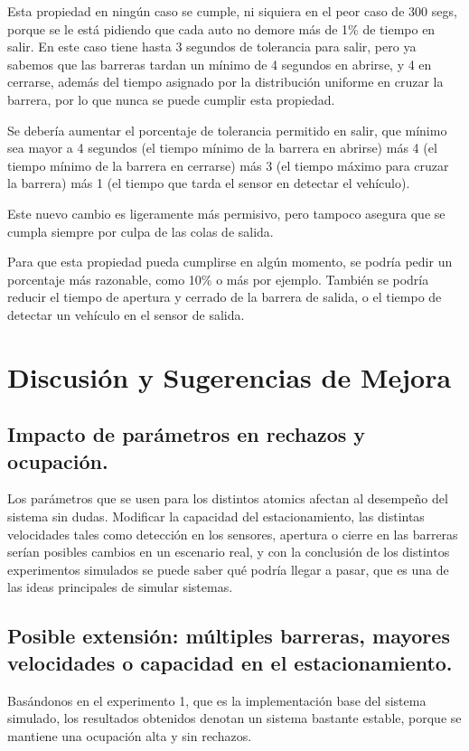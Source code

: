 \documentclass[12pt]{article}
\begin{document}
Esta propiedad en ningún caso se cumple, ni siquiera en el peor caso de 300 segs, porque se le está pidiendo que cada auto no demore más de 1\% de tiempo en salir. En este caso tiene hasta 3 segundos de tolerancia para salir, pero ya sabemos que las barreras tardan un mínimo de 4 segundos en abrirse, y 4 en cerrarse, además del tiempo asignado por la distribución uniforme en cruzar la barrera, por lo que nunca se puede cumplir esta propiedad.

Se debería aumentar el porcentaje de tolerancia permitido en salir, que mínimo sea mayor a 4 segundos (el tiempo mínimo de la barrera en abrirse) más 4 (el tiempo mínimo de la barrera en cerrarse) más 3 (el tiempo máximo para cruzar la barrera) más 1 (el tiempo que tarda el sensor en detectar el vehículo).

Este nuevo cambio es ligeramente más permisivo, pero tampoco asegura que se cumpla siempre por culpa de las colas de salida. 

Para que esta propiedad pueda cumplirse en algún momento, se podría pedir un porcentaje más razonable, como 10\% o más por ejemplo. También se podría reducir el tiempo de apertura y cerrado de la barrera de salida, o el tiempo de detectar un vehículo en el sensor de salida.

\section{Discusión y Sugerencias de Mejora}

\subsection{Impacto de parámetros en rechazos y ocupación.}
Los parámetros que se usen para los distintos atomics afectan al desempeño del sistema sin dudas. Modificar la capacidad del estacionamiento, las distintas velocidades tales como detección en los sensores, apertura o cierre en las barreras serían posibles cambios en un escenario real, y con la conclusión de los distintos experimentos simulados se puede saber qué podría llegar a pasar, que es una de las ideas principales de simular sistemas.

\subsection{Posible extensión: múltiples barreras, mayores velocidades o capacidad en el estacionamiento.}
Basándonos en el experimento 1, que es la implementación base del sistema simulado, los resultados obtenidos denotan un sistema bastante estable, porque se mantiene una ocupación alta y sin rechazos.
\end{document}
